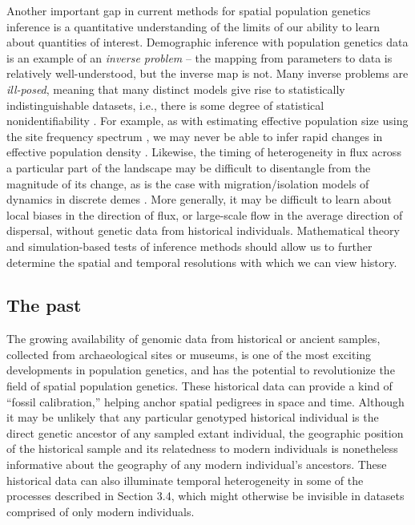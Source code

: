 \documentclass{ar-1col}
\renewcommand{\emph}[1]{{\textit{#1}}}
\begin{document}
Another important gap in current methods for spatial population genetics inference 
is a quantitative understanding of the limits of our ability to learn about 
quantities of interest.
Demographic inference with population genetics data
is an example of an \emph{inverse problem} --
the mapping from parameters to data is relatively well-understood,
but the inverse map is not.
Many inverse problems are \emph{ill-posed},
meaning that many distinct models give rise to statistically indistinguishable datasets,
i.e., there is some degree of statistical nonidentifiability \citep{petrov2005well,stuart2010inverse}.
For example, 
as with estimating effective population size using the site frequency spectrum \citep{Myers2008},
we may never be able to infer rapid changes in effective population density
\citep[although see also][]{BhaskarSong2014descartes}.
Likewise, 
the timing of heterogeneity in flux across a particular part of the landscape 
may be difficult to disentangle from the magnitude of its change, 
as is the case with migration/isolation models 
of dynamics in discrete demes \citep{sousa2011nonidentifiability}.
More generally,
it may be difficult to learn about local biases in the direction of flux, 
or large-scale flow in the average direction of dispersal,
without genetic data from historical individuals.
Mathematical theory and simulation-based tests of inference methods
should allow us to further determine the spatial and temporal resolutions
with which we can view history.


\subsection{The past} 

The growing availability of genomic data from historical or ancient samples, 
collected from archaeological sites or museums,
is one of the most exciting developments in population genetics, 
and has the potential to revolutionize the field of spatial population genetics.
These historical data can provide a kind of ``fossil calibration,''
helping anchor spatial pedigrees in space and time.
Although it may be unlikely that any particular genotyped historical individual 
is the direct genetic ancestor of any sampled extant individual, 
the geographic position of the historical sample and its 
relatedness to modern individuals is nonetheless informative 
about the geography of any modern individual's ancestors.
These historical data can also illuminate temporal heterogeneity 
in some of the processes described in Section 3.4, 
which might otherwise be invisible in datasets comprised of only modern individuals.
\end{document}
